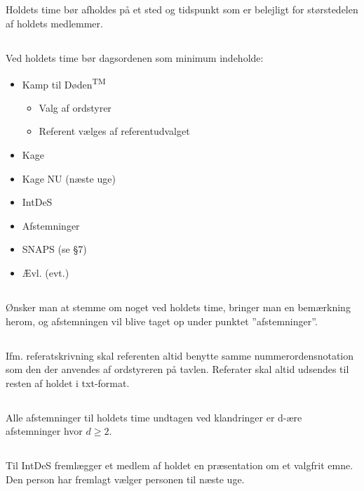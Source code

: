 \documentclass{article}
\let\OldS\S
\renewcommand{\S}{\OldS{}}
\begin{document}
\subsection{}
Holdets time bør afholdes på et sted og tidspunkt som er belejligt for størstedelen af holdets medlemmer.
\subsection{}
Ved holdets time bør dagsordenen som minimum indeholde:\\
\begin{itemize}
  \item Kamp til Døden\textsuperscript{TM}
  \begin{itemize}
    \item Valg af ordstyrer
    \item Referent vælges af referentudvalget
  \end{itemize}
  \item Kage
  \item Kage NU (næste uge)
  \item IntDeS
  \item Afstemninger
  \item SNAPS (se \S{7})
  \item Ævl. (evt.)
\end{itemize}
\subsection{}
Ønsker man at stemme om noget ved holdets time, bringer man en bemærkning herom, og afstemningen vil blive taget op under punktet ”afstemninger”.
\subsection{}
Ifm. referatskrivning skal referenten altid benytte samme nummerordensnotation som den der anvendes af ordstyreren på tavlen. Referater skal altid udsendes til resten af holdet i txt-format.
\subsection{}
Alle afstemninger til holdets time undtagen ved klandringer er d-ære afstemninger hvor $d \geq 2$.
\subsection{}
Til IntDeS fremlægger et medlem af holdet en præsentation om et valgfrit emne. Den person har fremlagt vælger personen til næste uge.
\end{document}
